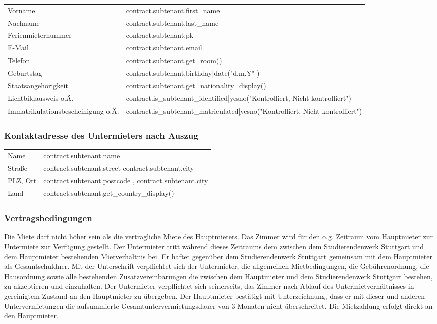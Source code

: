 \documentclass[9pt,pdftex,a4paper]{article}
\begin{document}
\begin{tabularx}{\textwidth}{XX}
Vorname & {{ contract.subtenant.first_name }}\\
Nachname &  {{ contract.subtenant.last_name }}\\
Ferienmieternummer & {{ contract.subtenant.pk }}\\
E-Mail & {{ contract.subtenant.email }}\\
Telefon & {{ contract.subtenant.get_room() }}\\
Geburtstag&  {{ contract.subtenant.birthday|date("d.m.Y" ) }}\\
Staatsangehörigkeit &  {{ contract.subtenant.get_nationality_display() }}\\
Lichtbildausweis o.Ä. & {{ contract.is_subtenant_identified|yesno("Kontrolliert, Nicht kontrolliert") }}\\
Immatrikulationsbescheinigung o.Ä.&  {{ contract.is_subtenant_matriculated|yesno("Kontrolliert, Nicht kontrolliert") }}\\
\end{tabularx}

\subsubsection*{Kontaktadresse des Untermieters nach Auszug}

\begin{tabularx}{\textwidth}{XX}
Name & {{ contract.subtenant.name }}\\
Straße & {{ contract.subtenant.street }} {{ contract.subtenant.city }}\\
PLZ, Ort & {{ contract.subtenant.postcode }}, {{ contract.subtenant.city }}\\
Land & {{ contract.subtenant.get_country_display() }}\\
\end{tabularx}

\newpage

\subsubsection*{Vertragsbedingungen}
Die Miete darf nicht höher sein als die vertragliche Miete des Hauptmieters.
Das Zimmer wird für den o.g. Zeitraum vom Hauptmieter zur Untermiete zur Verfügung gestellt.
Der Untermieter tritt während dieses Zeitraums dem zwischen dem Studierendenwerk Stuttgart und dem Hauptmieter bestehenden Mietverhältnis bei.
Er haftet gegenüber dem Studierendenwerk Stuttgart gemeinsam mit dem Hauptmieter als Gesamtschuldner.
Mit der Unterschrift verpflichtet sich der Untermieter, die allgemeinen Mietbedingungen, die Gebührenordnung, die Hausordnung sowie alle bestehenden Zusatzvereinbarungen die zwischen dem Hauptmieter und dem Studierendenwerk Stuttgart bestehen, zu akzeptieren und einzuhalten.
Der Untermieter verpflichtet sich seinerseits, das Zimmer nach Ablauf des Untermietverhältnisses in gereinigtem Zustand an den Hauptmieter zu übergeben.
Der Hauptmieter bestätigt mit Unterzeichnung, dass er mit dieser und anderen Untervermietungen die aufsummierte Gesamtuntervermietungsdauer von 3 Monaten nicht überschreitet.
Die Mietzahlung erfolgt direkt an den  Hauptmieter.
\end{document}

